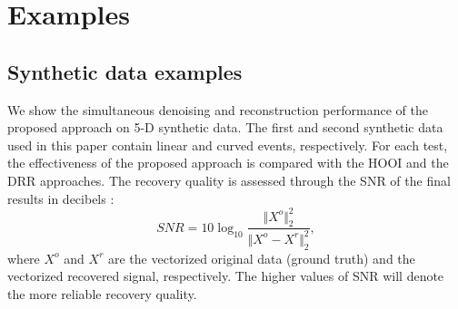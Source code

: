 \section{Examples}

\subsection{Synthetic data examples}

We show the simultaneous denoising and reconstruction performance of the proposed approach on 5-D synthetic data. The first and second synthetic data used in this paper contain linear and curved events, respectively. For each test, the effectiveness of the proposed  approach is compared with the HOOI and the DRR approaches. The recovery quality is assessed through the SNR of the final results in decibels \citep{chen2016simultaneous}: 
\begin{equation}
SNR=10\log_{10}\frac{\Vert X^{o} \Vert^2_2}{\Vert X^{o}-X^{r}\Vert^2_2},
\end{equation}
where $X^{o}$ and $X^{r}$ are the vectorized original data (ground truth) and the vectorized recovered signal, respectively. The higher values of SNR will denote the more reliable recovery quality.

